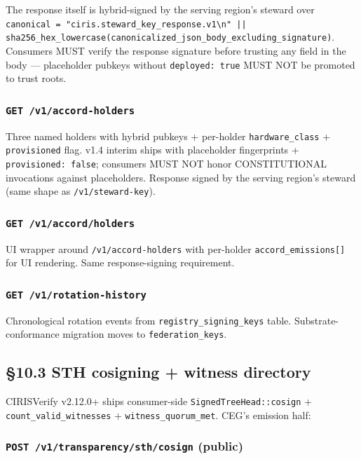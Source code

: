 \documentclass[11pt]{article}
\begin{document}
The response itself is hybrid-signed by the serving region's steward over \texttt{canonical = "ciris.steward\_key\_response.v1\textbackslash{}n" || sha256\_hex\_lowercase(canonicalized\_json\_body\_excluding\_signature)}. Consumers MUST verify the response signature before trusting any field in the body — placeholder pubkeys without \texttt{deployed: true} MUST NOT be promoted to trust roots.


\subsubsection*{\texttt{GET /v1/accord-holders}}


Three named holders with hybrid pubkeys + per-holder \texttt{hardware\_class} + \texttt{provisioned} flag. v1.4 interim ships with placeholder fingerprints + \texttt{provisioned: false}; consumers MUST NOT honor CONSTITUTIONAL invocations against placeholders. Response signed by the serving region's steward (same shape as \texttt{/v1/steward-key}).


\subsubsection*{\texttt{GET /v1/accord/holders}}


UI wrapper around \texttt{/v1/accord-holders} with per-holder \texttt{accord\_emissions[]} for UI rendering. Same response-signing requirement.


\subsubsection*{\texttt{GET /v1/rotation-history}}


Chronological rotation events from \texttt{registry\_signing\_keys} table. Substrate-conformance migration moves to \texttt{federation\_keys}.


\subsection*{§10.3 STH cosigning + witness directory}


CIRISVerify v2.12.0+ ships consumer-side \texttt{SignedTreeHead::cosign} + \texttt{count\_valid\_witnesses} + \texttt{witness\_quorum\_met}. CEG's emission half:


\subsubsection*{\texttt{POST /v1/transparency/sth/cosign} (public)}
\end{document}
